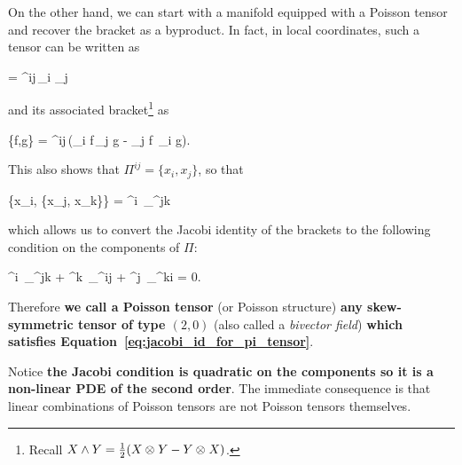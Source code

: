 On the other hand, we can start with a manifold equipped with a Poisson tensor and recover the bracket as a byproduct. In fact, in local coordinates, such a tensor can be written as
\begin{eqalign}
	\Pi =  \Pi^{ij}\,\partial_i \wedge \partial_j
\end{eqalign}
and its associated bracket\footnote{Recall $X \wedge Y = \frac12 (X \otimes_{} Y - Y \otimes_{} X)$.} as
\begin{eqalign}
	\{f,g\} =  \Pi^{ij}\,(\partial_i f\,\partial_j g - \partial_j f\, \partial_i g).
\end{eqalign}
This also shows that $\Pi^{ij} = \{x_i, x_j\}$, so that
\begin{eqalign}
	\{x_i, \{x_j, x_k\}\} =  \Pi^{i\ell}\, \partial_\ell \Pi^{jk}
\end{eqalign}
which allows us to convert the Jacobi identity of the brackets to the following condition on the components of $\Pi$:
\begin{eqalign}
\label{eq:jacobi_id_for_pi_tensor}
	\Pi^{i\ell}\, \partial_\ell \Pi^{jk} + \Pi^{k\ell}\, \partial_\ell \Pi^{ij} + \Pi^{j\ell}\, \partial_\ell \Pi^{ki} = 0.
\end{eqalign}
Therefore \textbf{we call a Poisson tensor} (or Poisson structure) \textbf{any skew-symmetric tensor of type $(2, 0)$} (also called a \emph{bivector field}) \textbf{which satisfies Equation~\ref{eq:jacobi_id_for_pi_tensor}}.

\begin{remark}
	Notice \textbf{the Jacobi condition is quadratic on the components so it is a non-linear PDE of the second order}. The immediate consequence is that linear combinations of Poisson tensors are not Poisson tensors themselves.
\end{remark}

